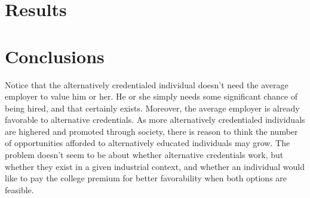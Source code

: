 \documentclass[review]{elsarticle}
\begin{document}
\section{Results}



\section{Conclusions}

Notice that the alternatively credentialed individual doesn't need the average employer to value him or her.
He or she simply needs some significant chance of being hired, and that certainly exists.
Moreover, the average employer is already favorable to alternative credentials.
As more alternatively credentialed individuals are highered and promoted through society,
there is reason to think the number of opportunities afforded to alternatively educated individuals may grow.
The problem doesn't seem to be about whether alternative credentials work, but whether they exist in a given industrial context,
and whether an individual would like to pay the college premium for better favorability when both options are feasible.




\end{document}
